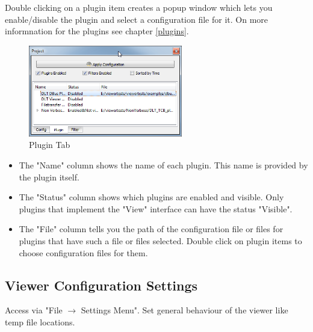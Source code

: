 \documentclass[a4paper,11pt]{article}
\begin{document}
Double clicking on a plugin item creates a popup window which lets you enable/disable the plugin and select a configuration file for it. On more informnation for the plugins see chapter \autoref{plugins}.

\begin{figure}[H]
 \centering
 \includegraphics[width=0.6\textwidth]{images/plugin_tab.png}
 \caption{Plugin Tab}
 \label{fig:plugintab}
\end{figure}



\begin{itemize}
 \item The "Name" column shows the name of each plugin. This name is provided by the plugin itself.
 \item The "Status" column shows which plugins are enabled and visible. Only plugins that implement the "View" interface can have the status "Visible".
 \item The "File" column tells you the path of the configuration file or files for plugins that have such a file or files selected. Double click on plugin items to choose configuration files for them.
\end{itemize}


\pagebreak
\subsection{Viewer Configuration Settings}
Access via "File \ensuremath{\rightarrow} Settings Menu".
\linebreak
Set general behaviour of the viewer like temp file locations.
\end{document}
